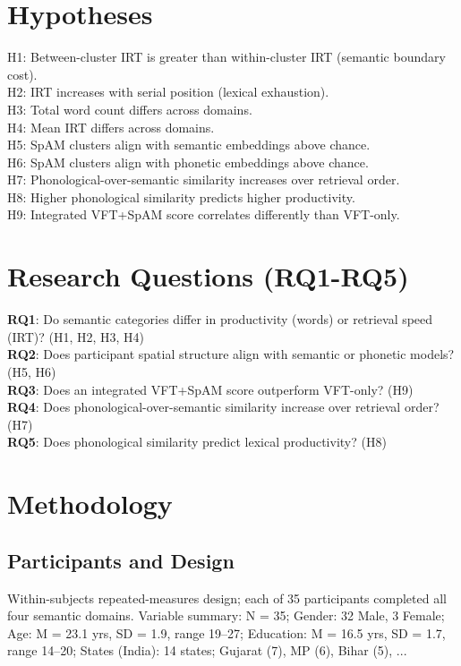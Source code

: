 \documentclass[12pt]{article}
\begin{document}
\section{Hypotheses}
H1: Between-cluster IRT is greater than within-cluster IRT (semantic boundary cost). \\
H2: IRT increases with serial position (lexical exhaustion). \\
H3: Total word count differs across domains. \\
H4: Mean IRT differs across domains. \\
H5: SpAM clusters align with semantic embeddings above chance. \\
H6: SpAM clusters align with phonetic embeddings above chance. \\
H7: Phonological-over-semantic similarity increases over retrieval order. \\
H8: Higher phonological similarity predicts higher productivity. \\
H9: Integrated VFT+SpAM score correlates differently than VFT-only.

\section{Research Questions (RQ1-RQ5)}
\noindent\textbf{RQ1}: Do semantic categories differ in productivity (words) or retrieval speed (IRT)? (H1, H2, H3, H4)\\
\textbf{RQ2}: Does participant spatial structure align with semantic or phonetic models? (H5, H6)\\
\textbf{RQ3}: Does an integrated VFT+SpAM score outperform VFT-only? (H9)\\
\textbf{RQ4}: Does phonological-over-semantic similarity increase over retrieval order? (H7)\\
\textbf{RQ5}: Does phonological similarity predict lexical productivity? (H8)

\section{Methodology}
\subsection{Participants and Design}
Within-subjects repeated-measures design; each of 35 participants completed all four semantic domains. Variable summary: N = 35; Gender: 32 Male, 3 Female; Age: M = 23.1 yrs, SD = 1.9, range 19--27; Education: M = 16.5 yrs, SD = 1.7, range 14--20; States (India): 14 states; Gujarat (7), MP (6), Bihar (5), ...
\end{document}
